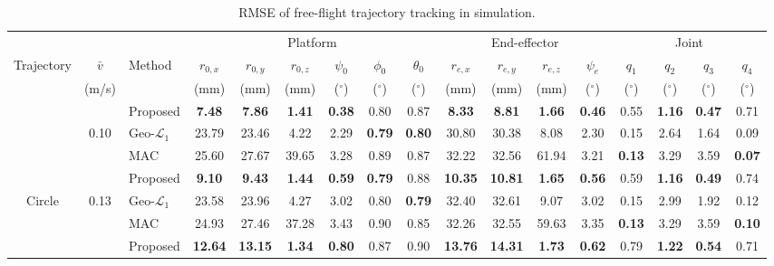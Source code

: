 \begin{table}[htbp]
\centering
\caption{RMSE of free-flight trajectory tracking in simulation.}
\label{tab:sim_free_flight_tracking}
\footnotesize
\setlength{\tabcolsep}{5pt}
\begin{threeparttable}
\begin{tabular}{c c l c c c c c c c c c c c c c c}
\toprule
& & & \multicolumn{6}{c}{Platform} & \multicolumn{4}{c}{End-effector} & \multicolumn{4}{c}{Joint} \\
\cmidrule(lr){4-9} \cmidrule(lr){10-13} \cmidrule(lr){14-17}
Trajectory & $\bar{v}$\tnote{1} & Method & $r_{0,x}$ & $r_{0,y}$ & $r_{0,z}$ & $\psi_0$ & $\phi_0$ & $\theta_0$ & $r_{e,x}$ & $r_{e,y}$ & $r_{e,z}$ & $\psi_e$ & $q_1$ & $q_2$ & $q_3$ & $q_4$ \\
& (m/s) & & (mm) & (mm) & (mm) & ($^\circ$) & ($^\circ$) & ($^\circ$) & (mm) & (mm) & (mm) & ($^\circ$) & ($^\circ$) & ($^\circ$) & ($^\circ$) & ($^\circ$) \\
\midrule
 &  & Proposed & \textbf{7.48} & \textbf{7.86} & \textbf{1.41} & \textbf{0.38} & 0.80 & 0.87 & \textbf{8.33} & \textbf{8.81} & \textbf{1.66} & \textbf{0.46} & 0.55 & \textbf{1.16} & \textbf{0.47} & 0.71 \\
 & 0.10 & Geo-$\mathcal{L}_1$~\cite{cai2025experiment} & 23.79 & 23.46 & 4.22 & 2.29 & \textbf{0.79} & \textbf{0.80} & 30.80 & 30.38 & 8.08 & 2.30 & 0.15 & 2.64 & 1.64 & 0.09 \\
 &  & MAC~\cite{yadav2024modular} & 25.60 & 27.67 & 39.65 & 3.28 & 0.89 & 0.87 & 32.22 & 32.56 & 61.94 & 3.21 & \textbf{0.13} & 3.29 & 3.59 & \textbf{0.07} \\
\addlinespace
 &  & Proposed & \textbf{9.10} & \textbf{9.43} & \textbf{1.44} & \textbf{0.59} & \textbf{0.79} & 0.88 & \textbf{10.35} & \textbf{10.81} & \textbf{1.65} & \textbf{0.56} & 0.59 & \textbf{1.16} & \textbf{0.49} & 0.74 \\
Circle & 0.13 & Geo-$\mathcal{L}_1$~\cite{cai2025experiment} & 23.58 & 23.96 & 4.27 & 3.02 & 0.80 & \textbf{0.79} & 32.40 & 32.61 & 9.07 & 3.02 & 0.15 & 2.99 & 1.92 & 0.12 \\
 &  & MAC~\cite{yadav2024modular} & 24.93 & 27.46 & 37.28 & 3.43 & 0.90 & 0.85 & 32.26 & 32.55 & 59.63 & 3.35 & \textbf{0.13} & 3.29 & 3.59 & \textbf{0.10} \\
\addlinespace
 &  & Proposed & \textbf{12.64} & \textbf{13.15} & \textbf{1.34} & \textbf{0.80} & 0.87 & 0.90 & \textbf{13.76} & \textbf{14.31} & \textbf{1.73} & \textbf{0.62} & 0.79 & \textbf{1.22} & \textbf{0.54} & 0.71 \\

\end{tabular}
\end{threeparttable}
\end{table}
